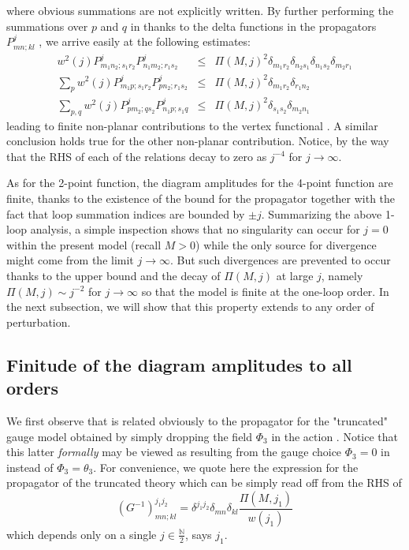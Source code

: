\documentclass[10pt]{book}
\theoremstyle{break}
\begin{document}
where obvious summations are not explicitly written. By further performing the summations over $p$ and $q$ in %
thanks to the delta functions in the propagators $P^j_{mn;kl}$ %
, we arrive easily at the following estimates:
\begin{eqnarray*}
w^2(j)P^j_{m_1n_2;s_1r_2}P^j_{n_1m_2;r_1s_2}&\le&\Pi(M,j)^2\delta_{m_1r_2}\delta_{n_2s_1}\delta_{n_1s_2}\delta_{m_2r_1}%
\\
\sum_pw^2(j)P^j_{m_1p;s_1r_2}P^j_{pn_2;r_1s_2}&\le&\Pi(M,j)^2\delta_{m_1r_2}\delta_{r_1n_2}%
\\
\sum_{p,q}w^2(j)P^j_{pm_2;qs_2}P^j_{n_1p;s_1q}&\le&\Pi(M,j)^2\delta_{s_1s_2}\delta_{m_2n_1}%
\end{eqnarray*}
leading to finite non-planar contributions to the vertex functional %
. A similar conclusion holds true for the other non-planar contribution. Notice, by the way that the RHS of each of the relations %
decay to zero as $j^{-4}$ for $j\to\infty$.\par

As for the 2-point function, the diagram amplitudes for the 4-point function are finite, thanks to the existence of the bound for the propagator %
together with the fact that loop summation indices are bounded by $\pm j$. Summarizing the above 1-loop analysis, a simple inspection shows that no singularity can occur for $j=0$ within the present model (recall $M>0$) while the only source for divergence might come from the limit $j\to\infty$. But such divergences are prevented to occur thanks to the upper bound %
and the decay of $\Pi(M,j)$ %
at large $j$, namely $\Pi(M,j)\sim j^{-2}$ for $j\to\infty$ so that the model %
is finite at the one-loop order. In the next subsection, we will show that this property extends to any order of perturbation.


\subsection{Finitude of the diagram amplitudes to all orders}


We first observe that %
is related obviously to the propagator for the "truncated" gauge model obtained by simply dropping the field $\Phi_3$ in the action %
. Notice that this latter {\it{formally}} may be viewed as resulting from the gauge choice $\Phi_3=0$ in %
instead of $\Phi_3=\theta_3$. For convenience, we quote here the expression for the propagator of the truncated theory which can be simply read off from the RHS of %
\begin{equation*}
(G^{-1})^{j_1j_2}_{mn;kl}=\delta^{j_1j_2}\delta_{mn}\delta_{kl}\frac{\Pi(M,j_1)}{w(j_1)}%
\end{equation*}
which depends only on a single $j\in\frac{\mathbb{N}}{2}$, says $j_1$.
\end{document}
